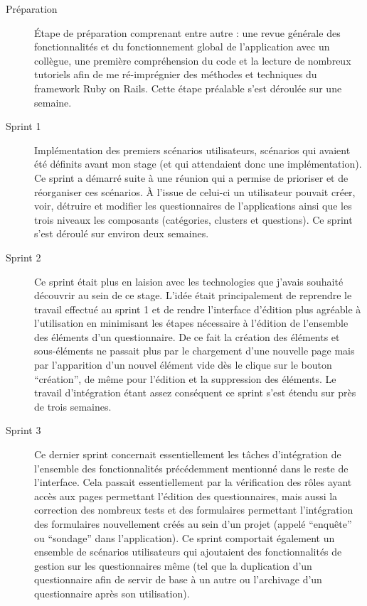 \documentclass[12pt,a4paper]{book}
\begin{document}
\begin{description}
  \item[Préparation] Étape de préparation comprenant entre autre : une revue générale des fonctionnalités et du fonctionnement global de l'application avec un collègue, une première compréhension du code et la lecture de nombreux tutoriels afin de me ré-imprégnier des méthodes et techniques du framework Ruby on Rails. Cette étape préalable s'est déroulée sur une semaine.
  \item[Sprint 1] Implémentation des premiers scénarios utilisateurs, scénarios qui avaient été définits avant mon stage (et qui attendaient donc une implémentation). Ce sprint a démarré suite à une réunion qui a permise de prioriser et de réorganiser ces scénarios. À l'issue de celui-ci un utilisateur pouvait créer, voir, détruire et modifier les questionnaires de l'applications ainsi que les trois niveaux les composants (catégories, clusters et questions). Ce sprint s'est déroulé sur environ deux semaines.
  \item[Sprint 2] Ce sprint était plus en laision avec les technologies que j'avais souhaité découvrir au sein de ce stage. L'idée était principalement de reprendre le travail effectué au sprint 1 et de rendre l'interface d'édition plus agréable à l'utilisation en minimisant les étapes nécessaire à l'édition de l'ensemble des éléments d'un questionnaire. De ce fait la création des éléments et sous-éléments ne passait plus par le chargement d'une nouvelle page mais par l'apparition d'un nouvel élément vide dès le clique sur le bouton ``création'', de même pour l'édition et la suppression des éléments. Le travail d'intégration étant assez conséquent ce sprint s'est étendu sur près de trois semaines.
  \item[Sprint 3] Ce dernier sprint concernait essentiellement les tâches d'intégration de l'ensemble des fonctionnalités précédemment mentionné dans le reste de l'interface. Cela passait essentiellement par la vérification des rôles ayant accès aux pages permettant l'édition des questionnaires, mais aussi la correction des nombreux tests et des formulaires permettant l'intégration des formulaires nouvellement créés au sein d'un projet (appelé ``enquête'' ou ``sondage'' dans l'application). Ce sprint comportait également un ensemble de scénarios utilisateurs qui ajoutaient des fonctionnalités de gestion sur les questionnaires même (tel que la duplication d'un questionnaire afin de servir de base à un autre ou l'archivage d'un questionnaire après son utilisation).
\end{description}
\end{document}
